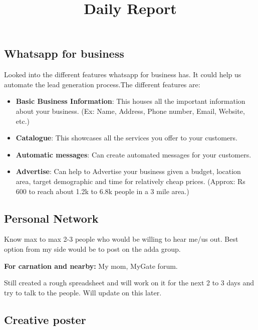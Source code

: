 \documentclass[12pt, a4paper]{article}
\begin{document}
\title{Daily Report}
\maketitle

\subsection{Whatsapp for business}

Looked into the different features whatsapp for business has. It could help us automate the lead generation process.The different features are:

\begin{itemize}
    \item \textbf{Basic Business Information}: This houses all the important information about your business. (Ex: Name, Address, Phone number, Email, Website, etc.)
    \item \textbf{Catalogue}: This showcases all the services you offer to your customers.
    \item \textbf{Automatic messages}: Can create automated messages for your customers.
    \item \textbf{Advertise}: Can help to Advertise your business given a budget, location area, target demographic and time for relatively cheap prices. (Approx: Rs 600 to reach about 1.2k to 6.8k people in a 3 mile area.)
\end{itemize}


\vspace{0.5cm}

\subsection{Personal Network}

Know max to max 2-3 people who would be willing to hear me/us out. Best option from my side would be to post on the adda group.

\vspace{0.25cm}

\noindent \textbf{For carnation and nearby:} My mom, MyGate forum.

\vspace{0.25cm}

\noindent Still created a rough spreadsheet and will work on it for the next 2 to 3 days and try to talk to the people. Will update on this later.

\subsection{Creative poster}
\end{document}
